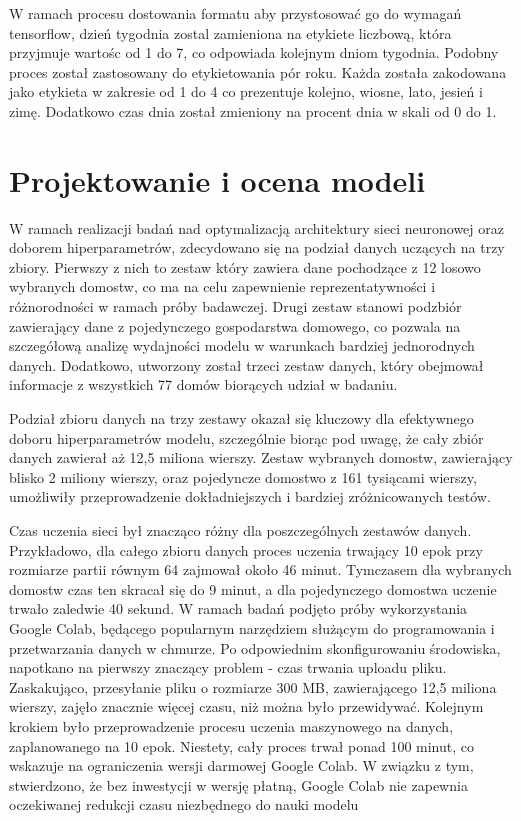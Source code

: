 \documentclass[a4paper,twoside,12pt]{book}
\begin{document}
W ramach procesu dostowania formatu aby przystosować go do wymagań tensorflow, dzień tygodnia zostal zamieniona na etykiete liczbową, która przyjmuje wartośc od 1 do 7, co odpowiada kolejnym dniom tygodnia. Podobny proces został zastosowany do etykietowania pór roku. Każda została zakodowana jako etykieta w zakresie od 1 do 4 co prezentuje kolejno, wiosne, lato, jesień i zimę. Dodatkowo czas dnia został zmieniony na procent dnia w skali od 0 do 1.
\section{Projektowanie i ocena modeli}
W ramach realizacji badań nad optymalizacją architektury sieci neuronowej oraz doborem hiperparametrów, zdecydowano się na podział danych uczących na trzy zbiory. Pierwszy z nich to zestaw który zawiera dane pochodzące z 12 losowo wybranych domostw, co ma na celu zapewnienie reprezentatywności i różnorodności w ramach próby badawczej. Drugi zestaw stanowi podzbiór zawierający dane z pojedynczego gospodarstwa domowego, co pozwala na szczegółową analizę wydajności modelu w warunkach bardziej jednorodnych danych. Dodatkowo, utworzony został trzeci zestaw danych, który obejmował informacje z wszystkich 77 domów biorących udział w badaniu.


Podział zbioru danych na trzy zestawy okazał się kluczowy dla efektywnego doboru hiperparametrów modelu, szczególnie biorąc pod uwagę, że cały zbiór danych zawierał aż 12,5 miliona wierszy. Zestaw wybranych domostw, zawierający blisko 2 miliony wierszy, oraz pojedyncze domostwo z 161 tysiącami wierszy, umożliwiły przeprowadzenie dokładniejszych i bardziej zróżnicowanych testów.

Czas uczenia sieci był znacząco różny dla poszczególnych zestawów danych. Przykładowo, dla całego zbioru danych proces uczenia trwający 10 epok przy rozmiarze partii równym 64 zajmował około 46 minut. Tymczasem dla wybranych domostw czas ten skracał się do 9 minut, a dla pojedynczego domostwa uczenie trwało zaledwie 40 sekund. W ramach badań podjęto próby wykorzystania Google Colab, będącego popularnym narzędziem służącym do programowania i przetwarzania danych w chmurze. Po odpowiednim skonfigurowaniu środowiska, napotkano na pierwszy znaczący problem - czas trwania uploadu pliku. Zaskakująco, przesyłanie pliku o rozmiarze 300 MB, zawierającego 12,5 miliona wierszy, zajęło znacznie więcej czasu, niż można było przewidywać. Kolejnym krokiem było przeprowadzenie procesu uczenia maszynowego na danych, zaplanowanego na 10 epok. Niestety, cały proces trwał ponad 100 minut, co wskazuje na ograniczenia wersji darmowej Google Colab. W związku z tym, stwierdzono, że bez inwestycji w wersję płatną, Google Colab nie zapewnia oczekiwanej redukcji czasu niezbędnego do nauki modelu
\end{document}
